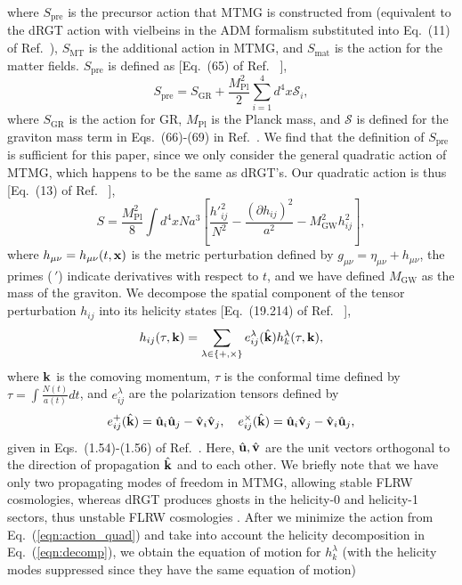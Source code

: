 \documentclass[prd,twocolumn,aps,psfig,nofootinbib,nobibnotes,superscriptaddress,preprintnumbers,times]{revtex4-2}
\begin{document}
\hspace{-1em}where $S_{\text{pre}}$ is the precursor action that MTMG is constructed from (equivalent to the dRGT action with vielbeins in the ADM formalism \cite{Arnowitt:1962hi} substituted into Eq.\ (11) of Ref.\ \cite{DeFelice:2015moy}), $S_{\text{MT}}$ is the additional action in MTMG, and $S_{\text{mat}}$
is the action for the matter fields. $S_{\text{pre}}$ is defined as [Eq.\ (65) of Ref.\ \cite{DeFelice:2015moy} ],
\begin{equation} \label{eqn:action_pre}
    S_{\text{pre}} = S_{\text{GR}} + \frac{M_{\text{Pl}}^2}{2}\sum_{i=1}^4 d^4x \mathcal{S}_i,
\end{equation} 
where $S_{\text{GR}}$ is the action for GR, $M_{\text{Pl}}$ is the Planck mass, and $\mathcal{S}$ is defined for the graviton mass term in Eqs.\ (66)-(69) in Ref.\ \cite{DeFelice:2015moy}. We find that the definition of $S_\text{pre}$ is sufficient for this paper, since we only consider the general quadratic action of MTMG, which happens to be the same as dRGT's. Our quadratic action is thus [Eq.\ (13) of Ref.\ \cite{DeFelice:2015hla} ],
\begin{equation} \label{eqn:action_quad}
     S = \frac{M_{\text{Pl}}^2}{8}\int d^4xNa^3\left[ \frac{h'^2_{ij}}{N^2}- \frac{(\partial h_{ij})^2}{a^2} - M_{\text{GW}}^2h_{ij}^2 \right],
\end{equation}
where $h_{\mu\nu} = h_{\mu\nu}(t,{\bf x})$ is the metric perturbation defined by $g_{\mu\nu} = \eta_{\mu\nu} + h_{\mu\nu}$, the primes ($\,'$) indicate derivatives with respect to $t$, and we have defined $M_\text{GW}$ as the mass of the graviton. We decompose the spatial component of the tensor perturbation $h_{ij}$ into its helicity states [Eq.\ (19.214) of Ref.\ \cite{Maggiore:v2} ], 
\begin{equation}\label{eqn:decomp}
    h_{ij}(\tau, {\bf k}) = \sum_{\lambda \in \{+, \times\}}e^\lambda_{ij}(\hat{\bf k})h_k^\lambda(\tau, {\bf k}),
\end{equation}
where ${\bf k}$ is the comoving momentum, $\tau$ is the conformal time defined by $\tau = \int \frac{N(t)}{a(t)}dt$, and $e^\lambda_{ij}$ are the polarization tensors defined by 
\begin{equation}\label{eqn:polarization}
    e^+_{ij}(\hat{\bf k}) = \hat{\bf u}_i\hat{\bf u}_j - \hat{\bf v}_i\hat{\bf v}_j, \quad e^\times_{ij}(\hat{\bf k}) = \hat{\bf u}_i\hat{\bf v}_j - \hat{\bf v}_i\hat{\bf u}_j,
\end{equation}
given in Eqs.\ (1.54)-(1.56) of Ref.\ \cite{Maggiore:v1}. Here, $\hat{\bf u}, \hat{\bf v}$ are the unit vectors orthogonal to the direction of propagation $\hat{\bf k}$ and to each other. We briefly note that we have only two propagating modes of freedom in MTMG, allowing stable FLRW cosmologies, whereas dRGT produces ghosts in the helicity-0 and helicity-1 sectors, thus unstable FLRW cosmologies \cite{DeFelice:2015hla}. After we minimize the action from Eq.\ (\ref{eqn:action_quad}) and take into account the helicity decomposition in Eq.\ (\ref{eqn:decomp}), we obtain the equation of motion for $h_k^\lambda$ (with the helicity modes suppressed since they have the same equation of motion)
\end{document}
